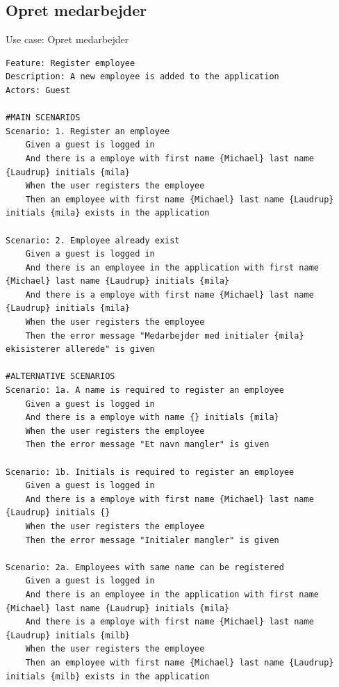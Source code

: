 \subsection{Opret medarbejder} 
\begin{listing}[H]
    \centering
    \caption{Use case: Opret medarbejder}\label{lst:usecase_register_employee}
    \begin{verbatim}  
Feature: Register employee
Description: A new employee is added to the application
Actors: Guest

#MAIN SCENARIOS
Scenario: 1. Register an employee
    Given a guest is logged in
    And there is a employe with first name {Michael} last name {Laudrup} initials {mila}  
    When the user registers the employee
    Then an employee with first name {Michael} last name {Laudrup} initials {mila} exists in the application

Scenario: 2. Employee already exist
    Given a guest is logged in
    And there is an employee in the application with first name {Michael} last name {Laudrup} initials {mila}
    And there is a employe with first name {Michael} last name {Laudrup} initials {mila}  
    When the user registers the employee
    Then the error message "Medarbejder med initialer {mila} ekisisterer allerede" is given

#ALTERNATIVE SCENARIOS
Scenario: 1a. A name is required to register an employee
    Given a guest is logged in
    And there is a employe with name {} initials {mila}  
    When the user registers the employee
    Then the error message "Et navn mangler" is given

Scenario: 1b. Initials is required to register an employee
    Given a guest is logged in
    And there is a employe with first name {Michael} last name {Laudrup} initials {}  
    When the user registers the employee
    Then the error message "Initialer mangler" is given

Scenario: 2a. Employees with same name can be registered
    Given a guest is logged in
    And there is an employee in the application with first name {Michael} last name {Laudrup} initials {mila}
    And there is a employe with first name {Michael} last name {Laudrup} initials {milb}  
    When the user registers the employee
    Then an employee with first name {Michael} last name {Laudrup} initials {milb} exists in the application

    \end{verbatim}
\end{listing}

